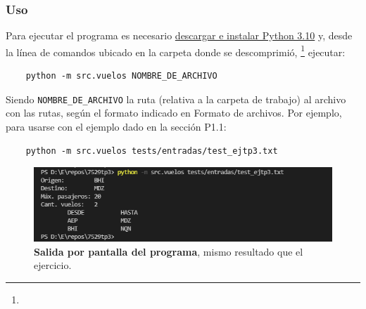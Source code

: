\documentclass[../tp3_grupo404.tex]{subfiles}
\begin{document}
\subsubsection{Uso}
Para ejecutar el programa es necesario
\href{https://www.python.org/downloads/}{descargar e instalar Python 3.10}
y, desde la línea de comandos ubicado en la carpeta donde se descomprimió,
\footnote{}
ejecutar:
\begin{verbatim}
    python -m src.vuelos NOMBRE_DE_ARCHIVO
\end{verbatim}
Siendo \texttt{NOMBRE\_DE\_ARCHIVO} la ruta (relativa a la carpeta de trabajo)
al archivo con las rutas, según el formato indicado en
Formato de archivos.
Por ejemplo, para usarse con el ejemplo dado en la sección P1.1:
\begin{verbatim}
    python -m src.vuelos tests/entradas/test_ejtp3.txt
\end{verbatim}

\begin{figure}[H]
    \centering
    \includegraphics[width=0.9\linewidth,angle=0,origin=c]{img/captura.PNG}
    \caption{\label{screencapture}\textbf{Salida por pantalla del programa}, mismo resultado que el ejercicio.}
\end{figure}

\end{document}
